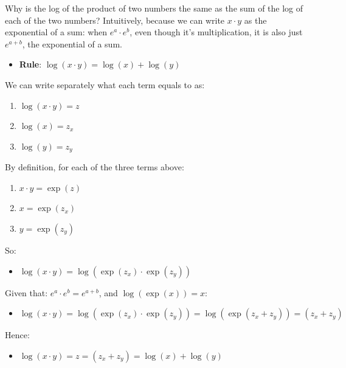 \documentclass[
]{book}
\providecommand{\tightlist}{%
  \setlength{\itemsep}{0pt}\setlength{\parskip}{0pt}}
\begin{document}
Why is the log of the product of two numbers the same as the sum of the
log of each of the two numbers? Intuitively, because we can write
\(x\cdot y\) as the exponential of a sum: when \(e^a \cdot e^b\), even
though it's multiplication, it is also just \(e^{a+b}\), the exponential
of a sum.

\begin{itemize}
\tightlist
\item
  \textbf{Rule}: \(\log (x\cdot y)=\log (x)+\log (y)\)
\end{itemize}

We can write separately what each term equals to as:

\begin{enumerate}
\def\labelenumi{\arabic{enumi}.}
\item
  \(\displaystyle \log (x\cdot y)=z\)
\item
  \(\displaystyle \log (x)=z_x\)
\item
  \(\displaystyle \log (y)=z_y\)
\end{enumerate}

By definition, for each of the three terms above:

\begin{enumerate}
\def\labelenumi{\arabic{enumi}.}
\item
  \(\displaystyle x\cdot y=\exp (z)\)
\item
  \(\displaystyle x=\exp (z_x )\)
\item
  \(\displaystyle y=\exp (z_y )\)
\end{enumerate}

So:

\begin{itemize}
\tightlist
\item
  \(\displaystyle \log (x\cdot y)=\log (\exp (z_x )\cdot \exp (z_y ))\)
\end{itemize}

Given that: \(e^a \cdot e^b =e^{a+b}\), and \(\log (\exp (x))=x\):

\begin{itemize}
\tightlist
\item
  \(\displaystyle \log (x\cdot y)=\log (\exp (z_x )\cdot \exp (z_y ))=\log (\exp (z_x +z_y ))=(z_x +z_y )\)
\end{itemize}

Hence:

\begin{itemize}
\tightlist
\item
  \(\displaystyle \log (x\cdot y)=z=(z_x +z_y )=\log (x)+\log (y)\)
\end{itemize}
\end{document}
